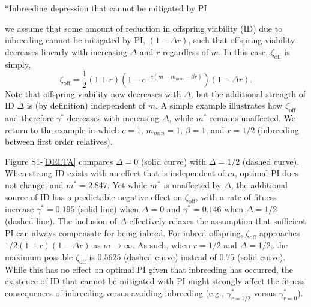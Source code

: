 \documentclass[12pt]{article}
\makeatletter
\renewcommand\section{\@startsection{section}{1}{0in}{-0.5\baselineskip}{0.1\baselineskip}{\normalfont\large\bfseries}}
\makeatother
\begin{document}
\clearpage

\section*{Inbreeding depression that cannot be mitigated by PI}

 we assume that some amount of reduction in offspring viability (ID) due to inbreeding cannot be mitigated by PI, $(1 - \Delta r)$, such that offspring viability decreases linearly with increasing $\Delta$ and $r$ regardless of $m$. In this case, $\zeta_{\textrm{off}}$ is simply,
\begin{equation}
\zeta_{\textrm{off}} = \frac{1}{2}\left(1+r\right)\left(1-e^{-c\left(m-m_{min}-\beta r\right)}\right) \left(1 - \Delta r\right).
\end{equation}
Note that offspring viability now decreases with $\Delta$, but the additional strength of ID $\Delta$ is (by definition) independent of $m$. A simple example illustrates how $\zeta_{\textrm{off}}$ and therefore $\gamma^{*}$ decreases with increasing $\Delta$, while $m^{*}$ remains unaffected. We return to the example in which $c=1$, $m_{min}=1$, $\beta=1$, and $r=1/2$ (inbreeding between first order relatives).

Figure S1-\ref{DELTA} compares $\Delta=0$ (solid curve) with $\Delta=1/2$ (dashed curve). When strong ID exists with an effect that is independent of $m$, optimal PI does not change, and $m^{*}=2.847$. Yet while $m^{*}$ is unaffected by $\Delta$, the additional source of ID has a predictable negative effect on $\zeta_{\textrm{off}}$, with a rate of fitness increase $\gamma^{*}=0.195$ (solid line) when $\Delta=0$ and $\gamma^{*}=0.146$ when $\Delta=1/2$ (dashed line). The inclusion of $\Delta$ effectively relaxes the assumption that sufficient PI can always compensate for being inbred. For inbred offspring, $\zeta_{\textrm{off}}$ approaches $1/2(1+r)(1 - \Delta r)$ as $m \to \infty$. As such, when $r=1/2$ and $\Delta=1/2$, the maximum possible $\zeta_{\textrm{off}}$ is $0.5625$ (dashed curve) instead of $0.75$ (solid curve). While this has no effect on optimal PI given that inbreeding has occurred, the existence of ID that cannot be mitigated with PI might strongly affect the fitness consequences of inbreeding versus avoiding inbreeding (e.g., $\gamma^{*}_{r=1/2}$ versus $\gamma^{*}_{r=0}$).
\end{document}
